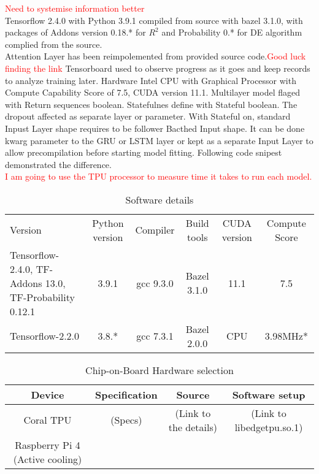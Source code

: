 \textcolor{red}{Need to systemise information better} \\
Tensorflow 2.4.0 with Python 3.9.1 compiled from source with bazel 3.1.0, with packages of Addons version 0.18.* for $R^2$ and Probability 0.* for DE algorithm complied from the source. \\
Attention Layer has been reimpolemented from provided source code.\textcolor{red}{Good luck finding the link}
Tensorboard used to observe progress as it goes and keep records to analyze training later.
Hardware Intel CPU with Graphical Processor with Compute Capability Score of 7.5, CUDA version 11.1.
Multilayer model flaged with Return sequences boolean. Statefulnes define with Stateful boolean. The dropout affected as separate layer or parameter. With Stateful on, standard Inpust Layer shape requires to be follower Bacthed Input shape. It can be done kwarg parameter to the GRU or LSTM layer or kept as a separate Input Layer to allow precompilation before starting model fitting. Following code snipest demonstrated the difference. \\
\textcolor{red}{I am going to use the TPU processor to measure time it takes to run each model.} \\
\begin{table}[ht]
    \centering
    \caption{Software details}
    \label{tab:my_label}
    \begin{tabular}{p{3.0cm}|c|c|c|c|c}
        Version & Python version & Compiler & Build tools & CUDA version & Compute Score\\
        Tensorflow-2.4.0, TF-Addons 13.0, TF-Probability 0.12.1 & 3.9.1 & gcc 9.3.0 & Bazel 3.1.0 & 11.1 & 7.5\\
        \hline
        Tensorflow-2.2.0 & 3.8.* & gcc 7.3.1 & Bazel 2.0.0 & CPU & 3.98MHz*
    \end{tabular}
\end{table}
\begin{table}[]
    \centering
    \caption{Chip-on-Board Hardware selection}
    \label{tab:my_label}
    \begin{tabular}{c|c|c|c}
        Device & Specification & Source & Software setup \\
        \hline
        Coral TPU & (Specs) & (Link to the details) & (Link to libedgetpu.so.1) \\
        \hline
        Raspberry Pi 4 (Active cooling) & 
    \end{tabular}
\end{table}
